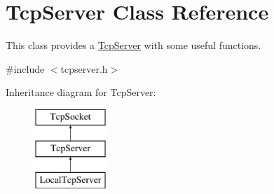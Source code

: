 \hypertarget{class_tcp_server}{}\section{Tcp\+Server Class Reference}
\label{class_tcp_server}


This class provides a \mbox{\hyperlink{class_tcp_server}{Tcp\+Server}} with some useful functions.  




{\ttfamily \#include $<$tcpserver.\+h$>$}

Inheritance diagram for Tcp\+Server\+:\begin{figure}[H]
\begin{center}
\leavevmode
\includegraphics[height=3.000000cm]{class_tcp_server}
\end{center}
\end{figure}
